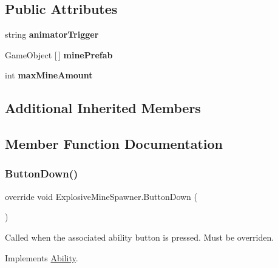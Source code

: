 \subsection*{Public Attributes}
\begin{DoxyCompactItemize}
\item 
\hypertarget{class_explosive_mine_spawner_ab65eee7acfea90cd7281e698595deb30}{}\label{class_explosive_mine_spawner_ab65eee7acfea90cd7281e698595deb30} 
string {\bfseries animator\+Trigger}
\item 
\hypertarget{class_explosive_mine_spawner_ae9ac930ef4e6abb738af8ebd70591d29}{}\label{class_explosive_mine_spawner_ae9ac930ef4e6abb738af8ebd70591d29} 
Game\+Object \mbox{[}$\,$\mbox{]} {\bfseries mine\+Prefab}
\item 
\hypertarget{class_explosive_mine_spawner_a54c422f87024b65917b7df13b19c5fd7}{}\label{class_explosive_mine_spawner_a54c422f87024b65917b7df13b19c5fd7} 
int {\bfseries max\+Mine\+Amount}
\end{DoxyCompactItemize}
\subsection*{Additional Inherited Members}


\subsection{Member Function Documentation}
\hypertarget{class_explosive_mine_spawner_a564b8d5b2b851dd2de186d4375c579fb}{}\label{class_explosive_mine_spawner_a564b8d5b2b851dd2de186d4375c579fb} 
\subsubsection{\texorpdfstring{Button\+Down()}{ButtonDown()}}
{\footnotesize\ttfamily override void Explosive\+Mine\+Spawner.\+Button\+Down (\begin{DoxyParamCaption}{ }\end{DoxyParamCaption})\hspace{0.3cm}{\ttfamily [virtual]}}



Called when the associated ability button is pressed. Must be overriden. 



Implements \hyperlink{class_ability_a7722265862f8b29828315725415ce266}{Ability}.

